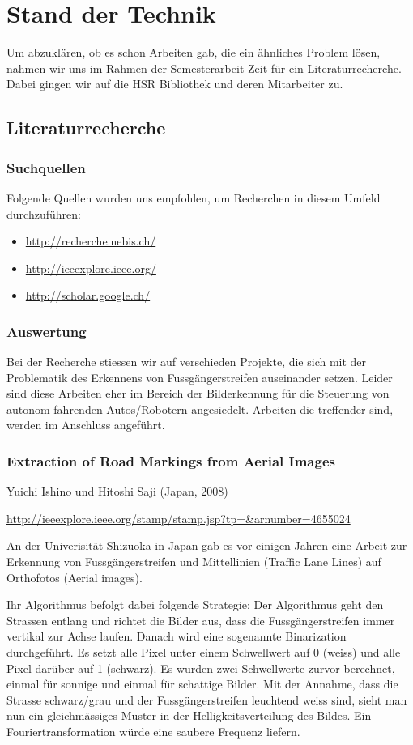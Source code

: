 \chapter*{Stand der Technik}
Um abzuklären, ob es schon Arbeiten gab, die ein ähnliches Problem lösen, nahmen wir uns im Rahmen der Semesterarbeit Zeit für ein Literaturrecherche. Dabei gingen wir auf die HSR Bibliothek und deren Mitarbeiter zu.
\section{Literaturrecherche}
\subsection{Suchquellen}
Folgende Quellen wurden uns empfohlen, um Recherchen in diesem Umfeld durchzuführen:
\begin{itemize}
	\item \url{http://recherche.nebis.ch/}
    \item \url{http://ieeexplore.ieee.org/}
    \item \url{http://scholar.google.ch/}
\end{itemize}

\subsection{Auswertung}
Bei der Recherche stiessen wir auf verschieden Projekte, die sich mit der Problematik des Erkennens von Fussgängerstreifen auseinander setzen. Leider sind diese Arbeiten eher im Bereich der Bilderkennung für die Steuerung von autonom fahrenden Autos/Robotern angesiedelt. Arbeiten die treffender sind, werden im Anschluss angeführt.
\subsection{Extraction of Road Markings from Aerial Images}
Yuichi Ishino und Hitoshi Saji (Japan, 2008) \newline 

\onehalfspacing 
\url{http://ieeexplore.ieee.org/stamp/stamp.jsp?tp=\&arnumber=4655024}
\onehalfspacing

An der Univerisität Shizuoka in Japan gab es vor einigen Jahren eine Arbeit zur Erkennung von Fussgängerstreifen und Mittellinien (Traffic Lane Lines) auf Orthofotos (Aerial images).

Ihr Algorithmus befolgt dabei folgende Strategie:
Der Algorithmus geht den Strassen entlang und richtet die Bilder aus, dass die Fussgängerstreifen immer vertikal zur Achse laufen. Danach wird eine sogenannte Binarization durchgeführt. Es setzt alle Pixel unter einem Schwellwert auf 0 (weiss) und alle Pixel darüber auf 1 (schwarz). Es wurden zwei Schwellwerte zurvor berechnet, einmal für sonnige und einmal für schattige Bilder.
Mit der Annahme, dass die Strasse schwarz/grau und der Fussgängerstreifen leuchtend weiss sind, sieht man nun ein gleichmässiges Muster in der Helligkeitsverteilung des Bildes. Ein Fouriertransformation würde eine saubere Frequenz liefern.

